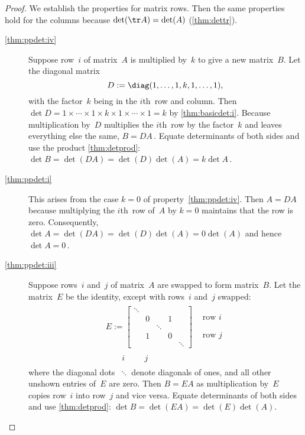 \begin{proof} 
We establish the  properties for matrix rows.  
Then the same properties hold for the columns because \(\det(\tr A)=\det(A)\) (\cref{thm:dettr}).
\begin{description}
\item[\ref{thm:ppdet:iv}]
Suppose row~\(i\) of matrix~\(A\) is multiplied by~\(k\) to give a new matrix~\(B\).
Let the diagonal matrix
\begin{equation*}
D:=\diag(1,\ldots,1,k,1,\ldots,1),
\end{equation*}
with the factor~\(k\) being in the \(i\)th~row and column.
Then \(\det D=1\times\cdots\times1\times k\times1\times\cdots\times1=k\)  by \cref{thm:basicdet:i}.
Because multiplication by~\(D\) multiplies the \(i\)th~row by the factor~\(k\) and leaves everything else the same,  \(B=DA\)\,.
Equate determinants of both sides and use the product \cref{thm:detprod}: \(\det B=\det(DA)=\det(D)\det(A)=k\det A\)\,.


\item[\ref{thm:ppdet:i}]
This arises from the case \(k=0\) of property~\ref{thm:ppdet:iv}.
Then \(A=DA\) because multiplying the \(i\)th~row of~\(A\) by \(k=0\) maintains that the row is zero.
Consequently, \(\det A=\det(DA)=\det(D)\det(A)=0\det(A)\) and hence \(\det A=0\)\,.

\item[\ref{thm:ppdet:iii}]
Suppose rows~\(i\) and~\(j\) of matrix~\(A\) are swapped to form matrix~\(B\).
Let the matrix~\(E\) be the identity, except with rows~\(i\) and~\(j\) swapped:
\begin{equation*}
\begin{array}{rl}
E:=\begin{bmatrix} 
\ddots
\\&0&&1
\\&&\ddots
\\&1&&0
\\&&&&\ddots \end{bmatrix}&
\begin{matrix} \phantom{\vdots}
\\\text{row }i \\\phantom{\vdots}
\\\text{row }j \\\phantom{\vdots} \end{matrix}
\\
\begin{matrix}\phantom{\cdots}&i&\phantom{\cdots}&j&\phantom{\cdots}  \end{matrix}\quad&
\end{array}
\end{equation*}
where the diagonal dots~\(\ddots\) denote diagonals of ones, and all other unshown entries of~\(E\) are zero.
Then \(B=EA\) as multiplication by~\(E\) copies row~\(i\) into row~\(j\) and vice versa.
Equate determinants of both sides and use \cref{thm:detprod}: \(\det B=\det(EA)=\det(E)\det(A)\).


\end{description}
\end{proof}
